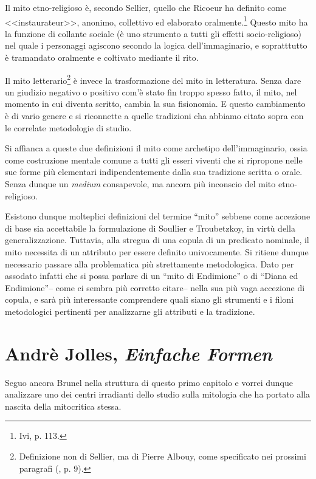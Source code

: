\documentclass[12pt,a4paper,openright, oneside]{book}
\begin{document}
Il mito etno-religioso è, secondo Sellier, quello che Ricoeur ha definito come <<instaurateur>>, anonimo, collettivo ed elaborato oralmente.\footnote{Ivi, p. 113.} Questo mito ha la funzione di collante sociale (è uno strumento a tutti gli effetti socio-religioso) nel quale i personaggi agiscono secondo la logica dell'immaginario, e sopratttutto è tramandato oralmente e coltivato mediante il rito. 

Il mito letterario\footnote{Definizione non di Sellier, ma di Pierre Albouy, come specificato nei prossimi paragrafi (\cite{Albouy}, p. 9).} è invece la trasformazione del mito in letteratura. Senza dare un giudizio negativo o positivo com'è stato fin troppo spesso fatto, il mito, nel momento in cui diventa scritto, cambia la sua fisionomia. E questo cambiamento è di vario genere e si riconnette a quelle tradizioni cha abbiamo citato sopra con le correlate metodologie di studio.

Si affianca a queste due definizioni il mito come archetipo dell'immaginario, ossia come costruzione mentale comune a tutti gli esseri viventi che si ripropone nelle sue forme più elementari indipendentemente dalla sua tradizione scritta o orale. Senza dunque un \textit{medium} consapevole, ma ancora più inconscio del mito etno-religioso.

Esistono dunque molteplici definizioni del termine ``mito'' sebbene come accezione di base sia accettabile la formulazione di Soullier e Troubetzkoy, in virtù della generalizzazione. Tuttavia, alla stregua di una copula di un predicato nominale, il mito necessita di un attributo per essere definito univocamente. Si ritiene dunque necessario passare alla problematica più strettamente metodologica. Dato per assodato infatti che si possa parlare di un ``mito di Endimione'' o di ``Diana ed Endimione''-- come ci sembra più corretto citare-- nella sua più vaga accezione di copula, e sarà  più interessante comprendere quali siano gli strumenti e i filoni metodologici pertinenti per analizzarne gli attributi e la tradizione.



\section{Andrè Jolles, \textit{Einfache Formen}}


Seguo ancora Brunel nella struttura di questo primo capitolo e vorrei dunque analizzare uno dei centri irradianti dello studio sulla mitologia che ha portato alla nascita della mitocritica stessa.
\end{document}
